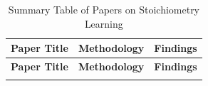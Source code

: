 
\begin{longtable}{|p{}|p{}|p{}|}
\hline
\textbf{Paper Title} & \textbf{Methodology} & \textbf{Findings} \\
\hline
\endfirsthead

\hline
\textbf{Paper Title} & \textbf{Methodology} & \textbf{Findings} \\
\hline
\endhead

\hline
\endfoot


\caption{Summary Table of Papers on Stoichiometry Learning}
\label{tab:stoichiometry}
\end{longtable}
